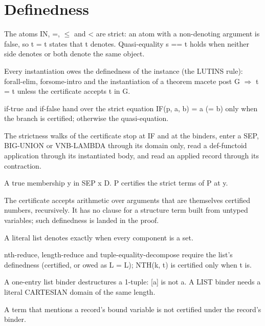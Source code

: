 \section*{Definedness}
\begin{description}[style=nextline,leftmargin=1.4cm]
\item[DS-18]\label{ds:18} The atoms IN, =, $\leq$ and < are strict: an atom with a non-denoting argument is false, so t = t states that t denotes. Quasi-equality s == t holds when neither side denotes or both denote the same object.
\item[DS-19]\label{ds:19} Every instantiation owes the definedness of the instance (the LUTINS rule): forall-elim, forsome-intro and the instantiation of a theorem macete post  G $\Rightarrow$ t = t  unless the certificate accepts t in G.
\item[DS-20]\label{ds:20} if-true and if-false hand over the strict equation IF(p, a, b) = a (= b) only when the branch is certified; otherwise the quasi-equation.
\item[DS-21]\label{ds:21} The strictness walks of the certificate stop at IF and at the binders, enter a SEP, BIG-UNION or VNB-LAMBDA through its domain only, read a def-functoid application through its instantiated body, and read an applied record through its contraction.
\item[DS-22]\label{ds:22} A true membership y in SEP x D. P certifies the strict terms of P at y.
\item[DS-23]\label{ds:23} The certificate accepts arithmetic over arguments that are themselves certified numbers, recursively. It has no clause for a structure term built from untyped variables; such definedness is landed in the proof.
\item[DS-24]\label{ds:24} A literal list denotes exactly when every component is a set.
\item[DS-25]\label{ds:25} nth-reduce, length-reduce and tuple-equality-decompose require the list's definedness (certified, or owed as L = L); NTH(k, t) is certified only when t is.
\item[DS-26]\label{ds:26} A one-entry list binder destructures a 1-tuple: [a] is not a. A LIST binder needs a literal CARTESIAN domain of the same length.
\item[DS-27]\label{ds:27} A term that mentions a record's bound variable is not certified under the record's binder.

\end{description}
